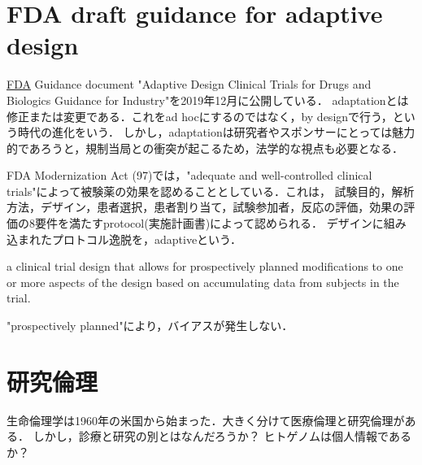\documentclass[uplatex,dvipdfmx]{jsreport}
\begin{document}
\section{FDA draft guidance for adaptive design}

\begin{tcolorbox}[colframe=ForestGreen, colback=ForestGreen!10!white,breakable,colbacktitle=ForestGreen!40!white,coltitle=black,fonttitle=\bfseries\sffamily,
title=]
    \href{https://www.fda.gov/regulatory-information/search-fda-guidance-documents/adaptive-design-clinical-trials-drugs-and-biologics-guidance-industry}{FDA}
    Guidance document "Adaptive Design Clinical Trials for Drugs and Biologics Guidance for Industry"を2019年12月に公開している．
    adaptationとは修正または変更である．これをad hocにするのではなく，by designで行う，という時代の進化をいう．
    しかし，adaptationは研究者やスポンサーにとっては魅力的であろうと，規制当局との衝突が起こるため，法学的な視点も必要となる．
\end{tcolorbox}

\begin{history}
    FDA Modernization Act (97)では，"adequate and well-controlled  clinical trials"によって被験薬の効果を認めることとしている．これは，
    試験目的，解析方法，デザイン，患者選択，患者割り当て，試験参加者，反応の評価，効果の評価の8要件を満たすprotocol(実施計画書)によって認められる．
    デザインに組み込まれたプロトコル逸脱を，adaptiveという．
\end{history}

\begin{definition}
    a clinical trial design that
    allows for prospectively planned modifications to one or more aspects of the design based on
    accumulating data from subjects in the trial.
\end{definition}
\begin{remark}
    "prospectively planned"により，バイアスが発生しない．
\end{remark}

\section{研究倫理}

\begin{tcolorbox}[colframe=ForestGreen, colback=ForestGreen!10!white,breakable,colbacktitle=ForestGreen!40!white,coltitle=black,fonttitle=\bfseries\sffamily,
title=]
    生命倫理学は1960年の米国から始まった．大きく分けて医療倫理と研究倫理がある．
    しかし，診療と研究の別とはなんだろうか？
    ヒトゲノムは個人情報であるか？
\end{tcolorbox}
\end{document}
